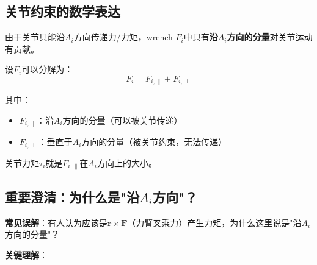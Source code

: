 \documentclass[12pt,a4paper]{article}
\begin{document}
\subsection{关节约束的数学表达}

由于关节只能沿$A_i$方向传递力/力矩，wrench $F_i$中只有\textbf{沿$A_i$方向的分量}对关节运动有贡献。

设$F_i$可以分解为：
\begin{equation}
F_i = F_{i,\parallel} + F_{i,\perp}
\end{equation}

其中：
\begin{itemize}
\item $F_{i,\parallel}$：沿$A_i$方向的分量（可以被关节传递）
\item $F_{i,\perp}$：垂直于$A_i$方向的分量（被关节约束，无法传递）
\end{itemize}

关节力矩$\tau_i$就是$F_{i,\parallel}$在$A_i$方向上的大小。

\subsection{重要澄清：为什么是"沿$A_i$方向"？}

\textbf{常见误解}：有人认为应该是$\bm{r} \times \bm{F}$（力臂叉乘力）产生力矩，为什么这里说是"沿$A_i$方向的分量"？

\textbf{关键理解}：
\end{document}
